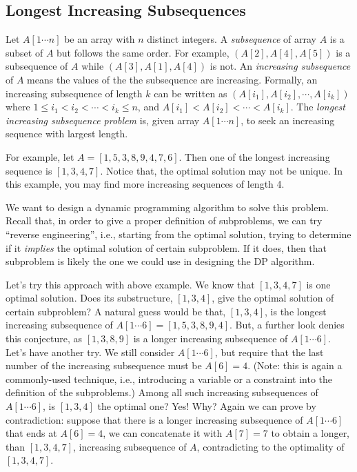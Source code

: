 \subsection*{Longest Increasing Subsequences}

Let $A[1\cdots n]$ be an array with $n$ distinct integers.
A \emph{subsequence} of array $A$ is a subset of $A$ but follows
the same order. For example, $(A[2], A[4], A[5])$ is a subsequence of $A$
while $(A[3], A[1], A[4])$ is not.
An \emph{increasing subsequence} of $A$ means the values of the
the subsequence are increasing.
Formally, an increasing subsequence of length $k$ can be written
as $(A[i_1], A[i_2], \cdots, A[i_k])$ where $1\le i_1 < i_2 < \cdots < i_k \le n$,
and $A[i_1] < A[i_2] < \cdots < A[i_k]$.
The \emph{longest increasing subsequence problem} is, given array $A[1\cdots n]$,
to seek an increasing sequence with largest length.

For example, let $A = [1, 5, 3, 8, 9, 4, 7, 6]$. Then one of the longest
increasing sequence is $[1, 3, 4, 7]$. Notice that, the optimal solution
may not be unique. In this example, you may find more increasing sequences 
of length 4.

We want to design a dynamic programming algorithm to solve this problem.
Recall that, in order to give a proper definition of subproblems,
we can try ``reverse engineering'', i.e., starting from the optimal
solution, trying to determine if it \emph{implies} the optimal solution
of certain subproblem. If it does, then that subproblem is likely the one
we could use in designing the DP algorithm.

Let's try this approach with above example. We know that $[1, 3, 4, 7]$
is one optimal solution. Does its substructure, $[1, 3, 4]$, give the optimal
solution of certain subproblem? A natural guess would be that, $[1, 3, 4]$,
is the longest increasing subsequence of $A[1\cdots 6] = [1, 5, 3, 8, 9, 4]$.
But, a further look denies this conjecture, as $[1, 3, 8, 9]$ is a longer
increasing subsequence of $A[1\cdots 6]$.
Let's have another try. We still consider $A[1\cdots 6]$, but require that
the last number of the increasing subsequence must be $A[6] = 4$.
(Note: this is again a commonly-used technique, i.e., introducing a variable or a constraint
into the definition of the subproblems.)
Among all such increasing subsequences of $A[1\cdots 6]$, is $[1, 3, 4]$ the optimal one?
Yes! Why? Again we can prove by contradiction: suppose that there is a longer increasing subsequence of $A[1\cdots 6]$
that ends at $A[6] = 4$, we can concatenate it with $A[7] = 7$ to obtain 
a longer, than $[1, 3, 4, 7]$, increasing subsequence of $A$, contradicting
to the optimality of $[1, 3, 4, 7]$.

